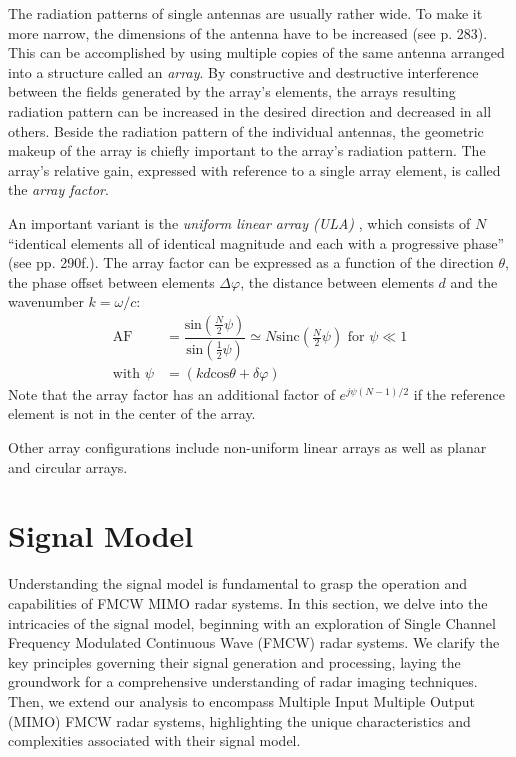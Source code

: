 The radiation patterns of single antennas are usually rather wide.
To make it more narrow, the dimensions of the antenna have to be increased (see \cite{balanis} p. 283).
This can be accomplished by using multiple copies of the same antenna arranged into a structure called an \emph{array}.
By constructive and destructive interference between the fields generated by the array's elements,
the arrays resulting radiation pattern can be increased in the desired direction and decreased in all others.
Beside the radiation pattern of the individual antennas,
the geometric makeup of the array is chiefly important to the array's radiation pattern.
The array's relative gain, expressed with reference to a single array element,
is called the \emph{array factor}.

An important variant is the \emph{uniform linear array (ULA)} ,
which consists of $N$
``identical elements all of identical magnitude and each with a progressive phase'' (see \cite{balanis} pp. 290f.).
The array factor can be expressed as a function of the direction $\theta$,
the phase offset between elements $\Delta \varphi$, the distance between elements $d$
and the wavenumber $k=\omega/c$:
\begin{align}
    \text{AF}         & = \dfrac{\text{sin}\left(\frac{N}{2}\psi\right)}{\text{sin}\left(\frac{1}{2}\psi\right)}
    \simeq N \text{sinc}\left(\frac{N}{2}\psi\right) \text{ for } \psi \ll 1                                     \\
    \text{with } \psi & = (kd\text{cos}\theta + \delta\varphi)
\end{align}
Note that the array factor has an additional factor of $e^{j\psi(N-1)/2}$
if the reference element is not in the center of the array.

Other array configurations include non-uniform linear arrays as well as planar and circular arrays.

\section{Signal Model}
Understanding the signal model is fundamental to grasp the operation and capabilities of FMCW MIMO radar systems.
In this section, we delve into the intricacies of the signal model,
beginning with an exploration of Single Channel Frequency Modulated Continuous Wave (FMCW) radar systems.
We clarify the key principles governing their signal generation and processing,
laying the groundwork for a comprehensive understanding of radar imaging techniques.
Then, we extend our analysis to encompass Multiple Input Multiple Output (MIMO) FMCW radar systems,
highlighting the unique characteristics and complexities associated with their signal model.


